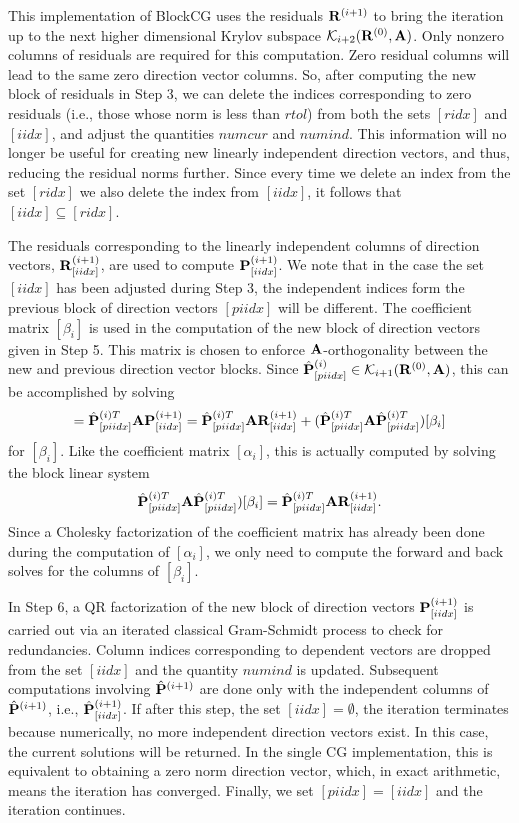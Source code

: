\documentclass{article}
\newcommand{\bA}{{\bf A}}
\newcommand{\bP}{{\bf P}}
\newcommand{\bR}{{\bf R}}
\newcommand{\dm}{\begin{displaymath}}
\newcommand{\edm}{\end{displaymath}}
\begin{document}
This implementation of BlockCG uses the residuals $\bR^{(i+1)}$ to
bring the iteration up to the next higher dimensional Krylov
subspace ${\cal K}_{i+2}(\bR^{(0)}, \bA)$. Only nonzero columns of
residuals are required for this computation. Zero residual columns
will lead to the same zero direction vector columns. So, after
computing the new block of residuals in Step 3, we can delete the
indices corresponding to zero residuals (i.e., those whose norm is
less than $rtol$) from both the sets $[ridx]$ and $[iidx]$, and
adjust the quantities $numcur$ and $numind$. This information will
no longer be useful for creating new linearly independent
direction vectors, and thus, reducing the residual norms further.
Since every time we delete an index from the set $[ridx]$ we also
delete the index from $[iidx]$, it follows that $[iidx] \subseteq
[ridx]$.

The residuals corresponding to the linearly independent columns of
direction vectors, $\bR^{(i+1)}_{[iidx]}$, are used to compute
$\bP^{(i+1)}_{[iidx]}$. We note that in the case the set $[iidx]$
has been adjusted during Step 3, the independent indices form the
previous block of direction vectors $[piidx]$ will be different.
The coefficient matrix $[\beta_i]$ is used in the computation of
the new block of direction vectors given in Step 5. This matrix is
chosen to enforce $\bA$-orthogonality between the new and previous
direction vector blocks. Since ${\hat \bP}^{(i)}_{[piidx]} \in
{\cal K}_{i+1}(\bR^{(0)}, \bA)$, this can be accomplished by
solving
 \dm
 [ {\bf 0} ] = {\hat \bP}^{(i)T}_{[piidx]} \bA \bP^{(i+1)}_{[iidx]} =
   {\hat \bP}^{(i)T}_{[piidx]} \bA \bR^{(i+1)}_{[iidx]}
  + ( {\hat \bP}^{(i)T}_{[piidx]} \bA {\hat \bP}^{(i)T}_{[piidx]})
 [ \beta_i ]
 \edm
for $[\beta_i]$. Like the coefficient matrix $[\alpha_i]$, this is
actually computed by solving the block linear system
 \dm
  {\hat \bP}^{(i)T}_{[piidx]} \bA {\hat \bP}^{(i)T}_{[piidx]})
 [ \beta_i ] = {\hat \bP}^{(i)T}_{[piidx]} \bA \bR^{(i+1)}_{[iidx]}.
 \edm
Since a Cholesky factorization of the coefficient matrix has
already been done during the computation of $[\alpha_i]$, we only
need to compute the forward and back solves for the columns of
$[\beta_i]$.

In Step 6, a QR factorization of the new block of direction
vectors $\bP^{(i+1)}_{[iidx]}$ is carried out via an iterated
classical Gram-Schmidt process to check for redundancies. Column
indices corresponding to dependent vectors are dropped from the
set $[iidx]$ and the quantity $numind$ is updated. Subsequent
computations involving ${\hat \bP}^{(i+1)}$ are done only with the
independent columns of ${\hat \bP}^{(i+1)}$, i.e., ${\hat
\bP}^{(i+1)}_{[iidx]}$. If after this step, the set $[iidx] =
\emptyset$, the iteration terminates because numerically, no more
independent direction vectors exist. In this case, the current
solutions will be returned. In the single CG implementation, this
is equivalent to obtaining a zero norm direction vector, which, in
exact arithmetic, means the iteration has converged. Finally, we
set $[piidx] = [iidx]$ and the iteration continues.
\end{document}
